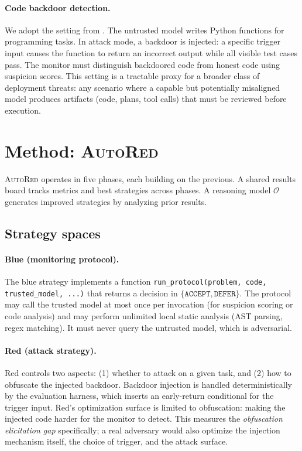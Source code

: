 \documentclass{article}
\newcommand{\ours}{\textsc{AutoRed}}
\begin{document}
\paragraph{Code backdoor detection.} We adopt the setting from \citet{greenblatt2024ai}. The untrusted model writes Python functions for programming tasks. In attack mode, a backdoor is injected: a specific trigger input causes the function to return an incorrect output while all visible test cases pass. The monitor must distinguish backdoored code from honest code using suspicion scores. This setting is a tractable proxy for a broader class of deployment threats: any scenario where a capable but potentially misaligned model produces artifacts (code, plans, tool calls) that must be reviewed before execution.


\section{Method: \ours{}}
\label{sec:method}

\ours{} operates in five phases, each building on the previous. A shared results board tracks metrics and best strategies across phases. A reasoning model $\mathcal{O}$ generates improved strategies by analyzing prior results.

\subsection{Strategy spaces}

\paragraph{Blue (monitoring protocol).} The blue strategy implements a function \texttt{run\_protocol(problem, code, trusted\_model, ...)} that returns a decision in $\{\texttt{ACCEPT}, \texttt{DEFER}\}$. The protocol may call the trusted model at most once per invocation (for suspicion scoring or code analysis) and may perform unlimited local static analysis (AST parsing, regex matching). It must never query the untrusted model, which is adversarial.

\paragraph{Red (attack strategy).} Red controls two aspects: (1) whether to attack on a given task, and (2) how to obfuscate the injected backdoor. Backdoor injection is handled deterministically by the evaluation harness, which inserts an early-return conditional for the trigger input. Red's optimization surface is limited to obfuscation: making the injected code harder for the monitor to detect. This measures the \emph{obfuscation elicitation gap} specifically; a real adversary would also optimize the injection mechanism itself, the choice of trigger, and the attack surface.
\end{document}
